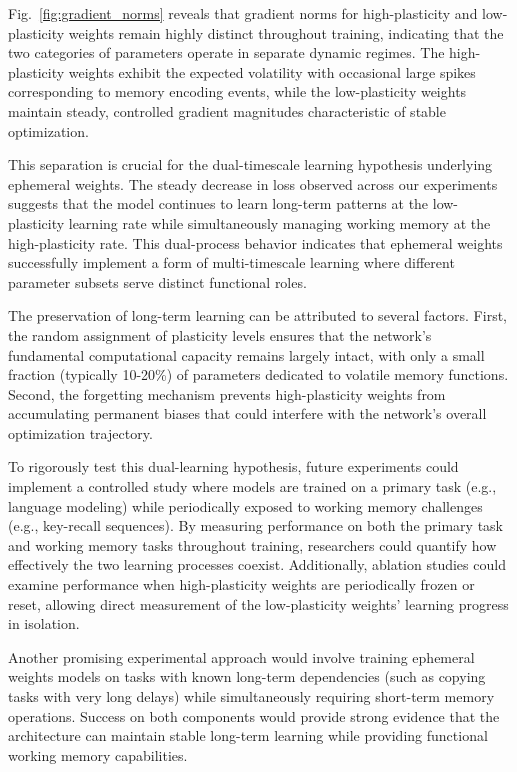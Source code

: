\documentclass[conference]{IEEEtran}
\begin{document}
Fig.~\ref{fig:gradient_norms} reveals that gradient norms for high-plasticity and low-plasticity weights remain highly distinct throughout training, indicating that the two categories of parameters operate in separate dynamic regimes. The high-plasticity weights exhibit the expected volatility with occasional large spikes corresponding to memory encoding events, while the low-plasticity weights maintain steady, controlled gradient magnitudes characteristic of stable optimization.

This separation is crucial for the dual-timescale learning hypothesis underlying ephemeral weights. The steady decrease in loss observed across our experiments suggests that the model continues to learn long-term patterns at the low-plasticity learning rate while simultaneously managing working memory at the high-plasticity rate. This dual-process behavior indicates that ephemeral weights successfully implement a form of multi-timescale learning where different parameter subsets serve distinct functional roles.

The preservation of long-term learning can be attributed to several factors. First, the random assignment of plasticity levels ensures that the network's fundamental computational capacity remains largely intact, with only a small fraction (typically 10-20\%) of parameters dedicated to volatile memory functions. Second, the forgetting mechanism prevents high-plasticity weights from accumulating permanent biases that could interfere with the network's overall optimization trajectory.

To rigorously test this dual-learning hypothesis, future experiments could implement a controlled study where models are trained on a primary task (e.g., language modeling) while periodically exposed to working memory challenges (e.g., key-recall sequences). By measuring performance on both the primary task and working memory tasks throughout training, researchers could quantify how effectively the two learning processes coexist. Additionally, ablation studies could examine performance when high-plasticity weights are periodically frozen or reset, allowing direct measurement of the low-plasticity weights' learning progress in isolation.

Another promising experimental approach would involve training ephemeral weights models on tasks with known long-term dependencies (such as copying tasks with very long delays) while simultaneously requiring short-term memory operations. Success on both components would provide strong evidence that the architecture can maintain stable long-term learning while providing functional working memory capabilities.
\end{document}
